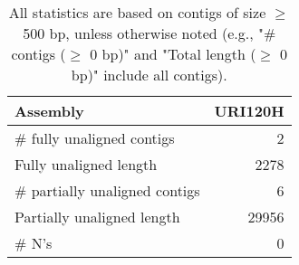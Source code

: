 \documentclass[12pt,a4paper]{article}
\begin{document}
\begin{table}[ht]
\begin{center}
\caption{All statistics are based on contigs of size $\geq$ 500 bp, unless otherwise noted (e.g., "\# contigs ($\geq$ 0 bp)" and "Total length ($\geq$ 0 bp)" include all contigs).}
\begin{tabular}{|l*{1}{|r}|}
\hline
Assembly & URI120H \\ \hline
\# fully unaligned contigs & 2 \\ \hline
Fully unaligned length & 2278 \\ \hline
\# partially unaligned contigs & 6 \\ \hline
Partially unaligned length & 29956 \\ \hline
\# N's & 0 \\ \hline
\end{tabular}
\end{center}
\end{table}
\end{document}
